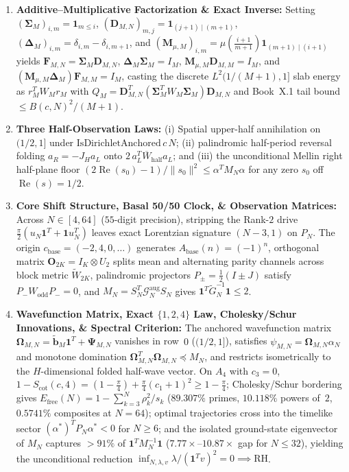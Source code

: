 \documentclass[11pt,a4paper]{article}
\theoremstyle{definition}
\begin{document}
\begin{enumerate}[leftmargin=1.8em,itemsep=2pt]
\item \textbf{Additive--Multiplicative Factorization \& Exact Inverse:} Setting $(\mathbf{\Sigma}_M)_{i,m} = \mathbf{1}_{m \le i}$, $(\mathbf{D}_{M,N})_{m,j} = \mathbf{1}_{(j+1)\mid(m+1)}$, $(\mathbf{\Delta}_M)_{i,m} = \delta_{i,m} - \delta_{i,m+1}$, and $(\mathbf{M}_{\mu,M})_{i,m} = \mu(\tfrac{i+1}{m+1})\mathbf{1}_{(m+1)\mid(i+1)}$ yields $\mathbf{F}_{M,N} = \mathbf{\Sigma}_M \mathbf{D}_{M,N}$, $\mathbf{\Delta}_M\mathbf{\Sigma}_M = I_M$, $\mathbf{M}_{\mu,M}\mathbf{D}_{M,M} = I_M$, and $(\mathbf{M}_{\mu,M}\mathbf{\Delta}_M)\mathbf{F}_{M,M} = I_M$, casting the discrete $L^2(1/(M+1), 1]$ slab energy as $r_M^T W_M r_M$ with $Q_M = \mathbf{D}_{M,N}^T (\mathbf{\Sigma}_M^T W_M \mathbf{\Sigma}_M)\mathbf{D}_{M,N}$ and Book~X.1 tail bound $\le B(c,N)^2/(M+1)$.
\item \textbf{Three Half-Observation Laws:} (i) Spatial upper-half annihilation on $(1/2, 1]$ under $\mathrm{IsDirichletAnchored}\,c\,N$; (ii) palindromic half-period reversal folding $a_R = -J_H a_L$ onto $2\,a_L^T \overline{W}_{\mathrm{half}} a_L$; and (iii) the unconditional Mellin right half-plane floor $(2\operatorname{Re}(s_0)-1)/\|s_0\|^2 \le \alpha^T M_N \alpha$ for any zero $s_0$ off $\operatorname{Re}(s)=1/2$.
\item \textbf{Core Shift Structure, Basal 50/50 Clock, \& Observation Matrices:} Across $N \in [4, 64]$ ($55$-digit precision), stripping the Rank-$2$ drive $\tfrac{\pi}{2}(u_N\mathbf{1}^T + \mathbf{1} u_N^T)$ leaves exact Lorentzian signature $(N-3, 1)$ on $P_N$. The origin $c_{\mathrm{base}} = (-2,4,0,\dots)$ generates $A_{\mathrm{base}}(n) = (-1)^n$, orthogonal matrix $\mathbf{O}_{2K} = I_K \otimes U_2$ splits mean and alternating parity channels across block metric $\widetilde{W}_{2K}$, palindromic projectors $P_\pm = \tfrac{1}{2}(I \pm J)$ satisfy $P_- W_{\mathrm{odd}} P_- = 0$, and $M_N = S_N^T \mathcal{G}_N^{\mathrm{aug}} S_N$ gives $\mathbf{1}^T \widetilde{G}_N^{-1}\mathbf{1} \le 2$.
\item \textbf{Wavefunction Matrix, Exact $\{1,2,4\}$ Law, Cholesky/Schur Innovations, \& Spectral Criterion:} The anchored wavefunction matrix $\mathbf{\Omega}_{M,N} = \tilde{\mathbf{b}}_M\mathbf{1}^T + \mathbf{\Psi}_{M,N}$ vanishes in row~$0$ ($(1/2,1]$), satisfies $\psi_{M,N} = \mathbf{\Omega}_{M,N}\alpha_N$ and monotone domination $\mathbf{\Omega}_{M,N}^T \mathbf{\Omega}_{M,N} \preceq M_N$, and restricts isometrically to the $H$-dimensional folded half-wave vector. On $A_4$ with $c_3=0$, $1 - S_{\mathrm{cot}}(c,4) = (1 - \tfrac{\pi}{4}) + \tfrac{\pi}{4}(c_1 + 1)^2 \ge 1 - \tfrac{\pi}{4}$; Cholesky/Schur bordering gives $E_{\mathrm{free}}(N) = 1 - \sum_{k=3}^N \rho_k^2/s_k$ ($89.307\%$ primes, $10.118\%$ powers of~$2$, $0.5741\%$ composites at $N=64$); optimal trajectories cross into the timelike sector $(\alpha^*)^T P_N \alpha^* < 0$ for $N \ge 6$; and the isolated ground-state eigenvector of $M_N$ captures $> 91\%$ of $\mathbf{1}^T M_N^{-1}\mathbf{1}$ ($7.77\times\text{--}10.87\times$ gap for $N \le 32$), yielding the unconditional reduction $\inf_{N,\lambda,v} \lambda/(\mathbf{1}^T v)^2 = 0 \implies \mathrm{RH}$.

\end{enumerate}
\end{document}
